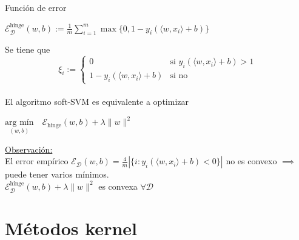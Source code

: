 \documentclass{beamer}
\begin{document}
\begin{frame}{Función de error}
\begin{center}$\mathcal{E}_{\mathcal{D}}^{\text{hinge}}(w,b) := \frac{1}{m} \sum_{i=1}^{m} \max \{0, 1 - y_i (\langle w, x_i \rangle + b)\}$
\end{center}
\vspace{0.15cm}
Se tiene que
{\footnotesize
 $$\xi_i := 
\begin{cases}
0 & \text{si } y_i (\langle w, x_i \rangle + b) > 1 \\
1 - y_i (\langle w, x_i \rangle + b) & \text{si no}
\end{cases}$$}\\
\vspace{0.15cm}
El algoritmo soft-SVM es equivalente a optimizar
\begin{center}
    $\underset{(w,b)}{\text{arg mín}} \quad \mathcal{E}_{\text{hinge}}(w,b) + \lambda \|w\|^2$
\end{center}

\vspace{0.15cm}
\underline{Observación:}\\ 
El error empírico $ \mathcal{E}_{\mathcal{D}}(w,b) =  \frac{4}{m}\left|\{i : y_i(\langle w,x_i\rangle + b) < 0\}\right|$ no es convexo $\implies$ puede tener varios mínimos.\\
\vspace{0.25cm}
$\mathcal{E}_{\mathcal{D}}^{\text{hinge}}(w,b) + \lambda\|w\|^2$ es convexa $\forall \mathcal{D}$

\end{frame}



\section{Métodos kernel}
\end{document}
